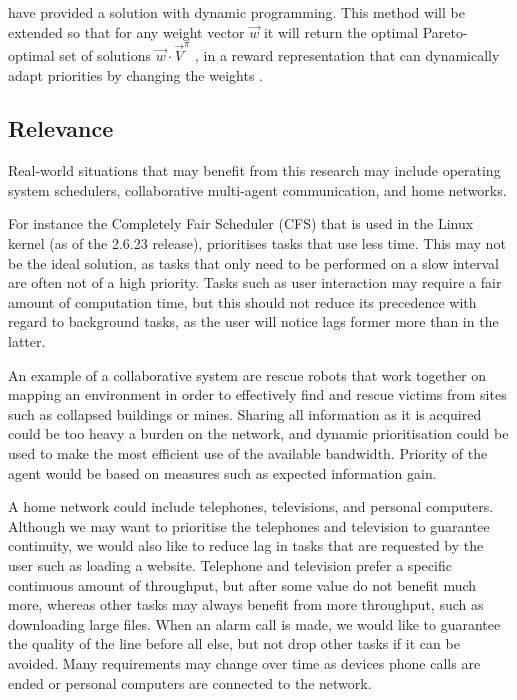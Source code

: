 \documentclass{article}
\begin{document}
\begin{multicols}{2}
	\citet{hansen2004dynamic} have provided a solution with dynamic programming.
	This method will be extended so that for any weight vector $\vec{w}$ it will
	return the optimal Pareto-optimal set of solutions $\vec{w} \cdot
	\vec{V}^\pi$ \citep{vamplew2011empirical}, in a reward representation that
	can dynamically adapt priorities by changing the weights
	\citep{barrett2008learning,natarajan2005dynamic}.

	\subsection{Relevance}
	\label{sub:relevance}
	Real-world situations that may benefit from this research may include
	operating system schedulers, collaborative multi-agent communication, and
	home networks.

	For instance the Completely Fair Scheduler (CFS) that is used in the Linux
	kernel (as of the 2.6.23 release), prioritises tasks that use less time.
	This may not be the ideal solution, as tasks that only need to be performed
	on a slow interval are often not of a high priority. Tasks such as user
	interaction may require a fair amount of computation time, but this should
	not reduce its precedence with regard to background tasks, as the user will
	notice lags former more than in the latter.

	An example of a collaborative system are rescue robots that work together on
	mapping an environment in order to effectively find and rescue victims from
	sites such as collapsed buildings or mines. Sharing all information as it is
	acquired could be too heavy a burden on the network, and dynamic
	prioritisation could be used to make the most efficient use of the available
	bandwidth. Priority of the agent would be based on measures such as expected
	information gain.

	A home network could include telephones, televisions, and personal
	computers. Although we may want to prioritise the telephones and television
	to guarantee continuity, we would also like to reduce lag in tasks that are
	requested by the user such as loading a website. Telephone and television
	prefer a specific continuous amount of throughput, but after some value do
	not benefit much more, whereas other tasks may always benefit from more
	throughput, such as downloading large files. When an alarm call is made, we
	would like to guarantee the quality of the line before all else, but not
	drop other tasks if it can be avoided. Many requirements may change over
	time as devices phone calls are ended or personal computers are connected to
	the network.


\end{multicols}
\end{document}
